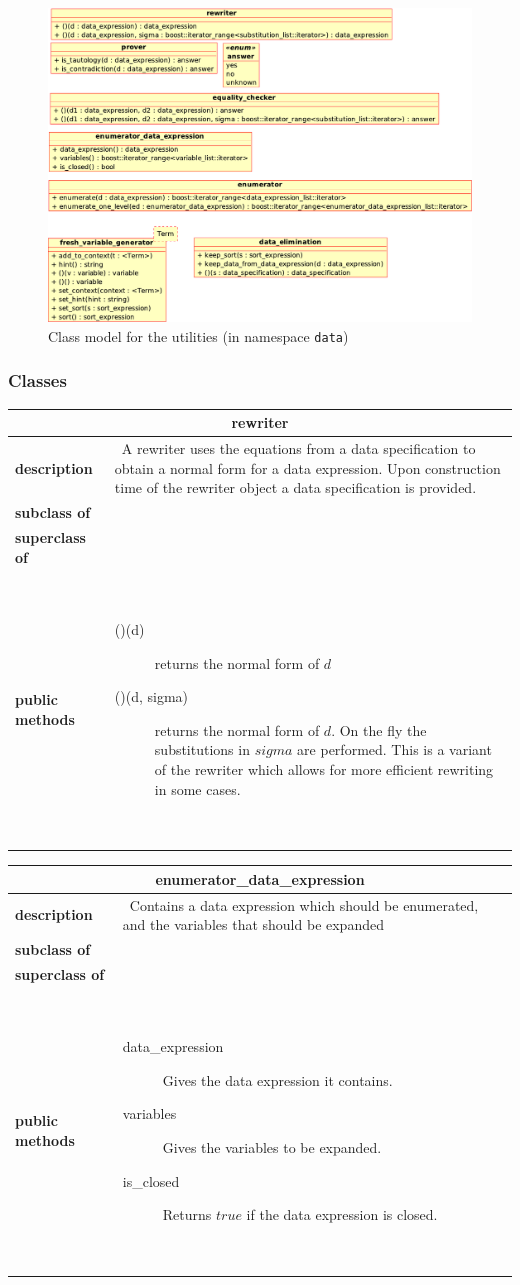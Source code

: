 \documentclass[a4paper,11pt]{article}
\newcommand{\dataclass}[5]{
\begin{flushleft}
\begin{longtable}{p{3cm} p{11cm}}
\multicolumn{2}{c}{\textbf{#1}}\\\hline\hline
\textbf{description} & ~#2~ \\\hline
\textbf{subclass of} & ~#3~ \\\hline
\textbf{superclass of} & ~#4~ \\\hline
\textbf{public methods} & ~#5~ \\\hline
\end{longtable}
\end{flushleft}
}
\begin{document}
\begin{figure}[htp]
    \begin{center}
      \includegraphics[width=\textwidth]{utilities}
      \caption{Class model for the utilities (in namespace \texttt{data})}
      \label{fig:class_utilities}
    \end{center}
  \end{figure}

\subsubsection{Classes}

\dataclass
  {rewriter}
  {A rewriter uses the equations from a data specification to obtain a normal form for a data expression. Upon construction time of the rewriter object a data specification is provided.}
  {}
  {}
  {\begin{description}
    \item[()(d)] returns the normal form of $d$
    \item[()(d, sigma)] returns the normal form of $d$. On the fly the substitutions in $sigma$ are performed. This is a variant of the rewriter which allows for more efficient rewriting in some cases.
   \end{description}}


\dataclass
  {enumerator\_data\_expression}
  {Contains a data expression which should be enumerated, and the variables that should be expanded}
  {}
  {}
  {\begin{description}
    \item[data\_expression] Gives the data expression it contains.
    \item[variables] Gives the variables to be expanded.
    \item[is\_closed] Returns $true$ if the data expression is closed.
   \end{description}}
\end{document}
